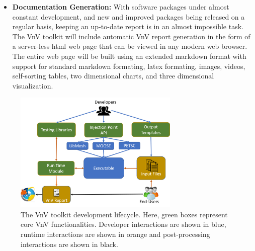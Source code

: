 \begin{itemize}
 \item{\bf Documentation Generation:} With software packages under almost constant development, and new and improved packages being released on a regular basis, keeping an up-to-date \VV report is in an almost impossible task. The VnV toolkit will include automatic VnV report generation in the form of a server-less html web page that can be viewed in any modern web browser. The entire web page will be built using an extended markdown format with support for standard markdown formating, latex formating, images, videos, self-sorting tables, two dimensional charts, and three dimensional visualization. %
 \end{itemize}

\begin{figure}
\centering
 \includegraphics[width=0.7\textwidth]{./narrative/figures/VnVOut.png}
 \caption{ The VnV toolkit development lifecycle. Here, green boxes represent core VnV functionalities. Developer interactions are shown in blue, runtime interactions are shown in orange and post-processing interactions are shown in black. \label{fig:toolchain} } 
\end{figure}
 
